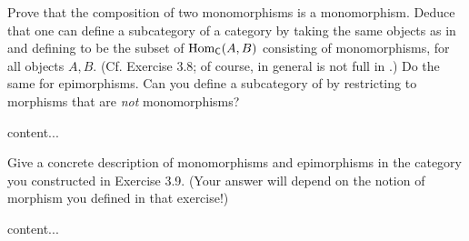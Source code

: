 \begin{exercise}
	Prove that the composition of two monomorphisms is a monomorphism. Deduce that one can define a subcategory  of a category  by taking the same objects as in  and defining  to be the subset of \(\Hom_{\text{\serif{C}}}(A, B)\) consisting of monomorphisms, for all objects \(A, B\). (Cf. Exercise 3.8; of course, in general  is not full in .) Do the same for epimorphisms. Can you define a subcategory  of  by restricting to morphisms that are \textit{not} monomorphisms?
\end{exercise}
\begin{solution}
	content...
\end{solution}

\begin{exercise}
	Give a concrete description of monomorphisms and epimorphisms in the category  you constructed in Exercise 3.9. (Your answer will depend on the notion of morphism you defined in that exercise!)
\end{exercise}
\begin{solution}
	content...
\end{solution}